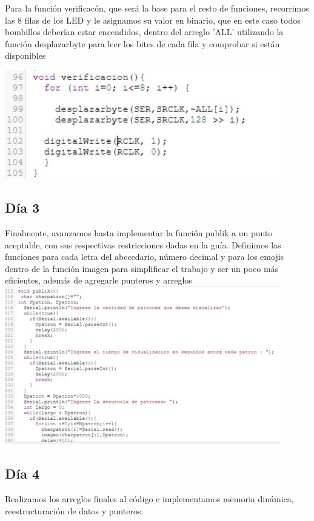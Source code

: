 \documentclass{article}
\begin{document}
\vspace{0.5cm}

Para la función verificacón, que será la base para el resto de funciones, recorrimos las 8 filas de los LED y le asignamos su valor en binario, que en este caso todos bombillos deberían estar encendidos, dentro del arreglo 'ALL' utilizando la función desplazarbyte para leer los bites de cada fila y comprobar si están disponibles\\

\vspace{0.5cm}

\includegraphics[width=12cm]{Veri.jpeg}

\subsection{Día 3}
Finalmente, avanzamos hasta implementar la función publik a un punto aceptable, con sus respectivas restricciones dadas en la guía. Definimos las funciones para cada letra del abecedario, número decimal y para los emojis dentro de la función imagen para simplificar el trabajo y ser un poco más eficientes, además de agregarle punteros y arreglos\\

\includegraphics[width=12cm]{Dia 3.jpeg}

\subsection{Día 4}
Realizamos los arreglos finales al código e implementamos memoria dinámica, reestructuración de datos y punteros.
\end{document}
